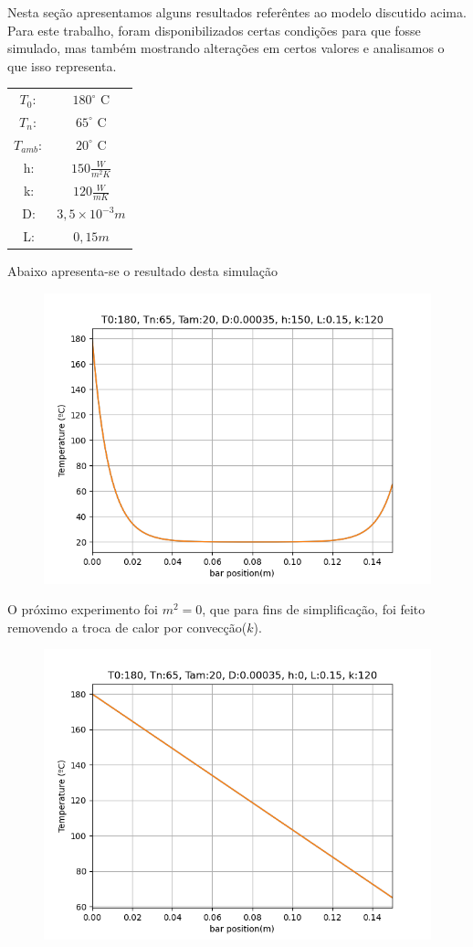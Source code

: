 \documentclass[a4paper, 12pt]{article}
\begin{document}
Nesta seção apresentamos alguns resultados referêntes ao modelo discutido acima. 
Para este trabalho, foram disponibilizados certas condições para que fosse simulado, mas também mostrando alterações em certos valores e analisamos o que isso representa.
\begin{table}[ht!]
\centering
\begin{tabular}{cc}
  $T_0:$ & $180^\circ$ C \\
  $T_n:$ & $65^\circ$ C  \\
  $T_{amb}:$ & $20^\circ$ C  \\
   h: & $150\frac{W}{m^2K}$ \\
   k: & $120\frac{W}{mK}$ \\
   D: & $3,5 \times 10^{-3}m$ \\
   L: & $0,15m$ \\
\end{tabular}
\end{table}
Abaixo apresenta-se o resultado desta simulação
\begin{figure}[ht!]
\centering
\includegraphics[scale=0.8]{figs/fst.png}
\end{figure}
O próximo experimento foi $m^2 = 0$, que para fins de simplificação, foi feito removendo a troca de calor por convecção($k$). 
\begin{figure}[ht!]
\centering
\includegraphics[scale=0.8]{figs/snd.png}
\end{figure}
\end{document}
